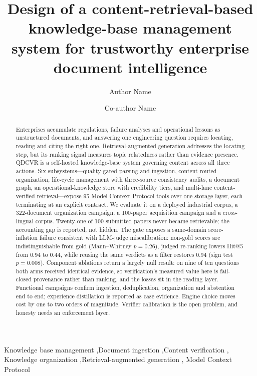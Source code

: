 \documentclass[final,5p,times,twocolumn]{elsarticle}
\begin{document}
\begin{frontmatter}

\title{Design of a content-retrieval-based knowledge-base management system
for trustworthy enterprise document intelligence}

\author[inst1]{Author Name}
\author[inst1]{Co-author Name}

\begin{abstract}
Enterprises accumulate regulations, failure analyses and operational lessons
as unstructured documents, and answering one engineering question requires
locating, reading and citing the right one. Retrieval-augmented generation
addresses the locating step, but its ranking signal measures topic relatedness
rather than evidence presence. QDCVR is a self-hosted
knowledge-base system governing content across all three
actions. Six subsystems---quality-gated parsing and ingestion, content-routed
organization, life-cycle management with three-source consistency audits, a
document graph, an operational-knowledge store with credibility tiers, and
multi-lane content-verified retrieval---expose 95 Model Context Protocol tools
over one storage layer, each terminating at an explicit contract. We evaluate it on a deployed industrial corpus, a
322-document organization campaign, a 100-paper acquisition campaign and a
cross-lingual corpus. Twenty-one of 100 submitted
papers never became retrievable; the accounting gap is reported, not hidden. The gate exposes a
same-domain score-inflation failure consistent with LLM-judge
miscalibration: non-gold scores are indistinguishable from gold
(Mann--Whitney $p = 0.26$), judged re-ranking lowers Hit@5 from 0.94 to 0.44,
while reusing the same verdicts as a filter restores 0.94 (sign test
$p = 0.008$). Component ablations return a largely null result: on nine of ten
questions both arms received identical evidence, so verification's measured
value here is fail-closed provenance rather than ranking, and the losses sit
in the reading layer. Functional campaigns confirm ingestion,
deduplication, organization and abstention end to end; experience distillation
is reported as case evidence. Engine
choice moves cost by one to two orders of magnitude. Verifier calibration is
the open problem, and honesty needs an enforcement layer.
\end{abstract}

\begin{keyword}
Knowledge base management \sep Document ingestion \sep Content verification \sep
Knowledge organization \sep Retrieval-augmented generation \sep
Model Context Protocol
\end{keyword}

\end{frontmatter}
\end{document}
